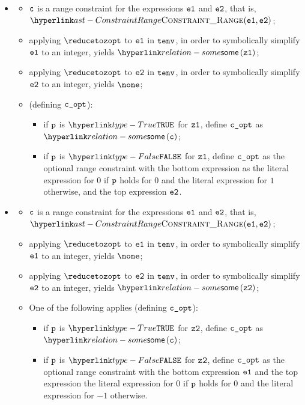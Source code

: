 \begin{itemize}
  \item {}
  \begin{itemize}
    \item $\texttt{c}$ is a range constraint for the expressions $\texttt{e1}$ and $\texttt{e2}$, that is, \\
          $\ConstraintRange(\veone, \vetwo)$;
    \item applying $\reducetozopt$ to $\texttt{e1}$ in $\texttt{tenv}$, in order to symbolically simplify $\texttt{e1}$ to an integer,
          yields $\some{\vzone}$;
    \item applying $\reducetozopt$ to $\texttt{e2}$ in $\texttt{tenv}$, in order to symbolically simplify $\texttt{e2}$ to an integer,
          yields $\none$;
    \item \OneApplies{} (defining $\texttt{c\_opt}$):
    \begin{itemize}
      \item if $\texttt{p}$ is $\True$ for $\texttt{z1}$, define $\texttt{c\_opt}$ as $\some{\vc}$;
      \item if $\texttt{p}$ is $\False$ for $\texttt{z1}$, define $\texttt{c\_opt}$ as the optional range constraint with the bottom expression
            as the literal expression for $0$ if $\texttt{p}$ holds for $0$ and the literal expression for $1$ otherwise,
            and the top expression $\texttt{e2}$.
    \end{itemize}
  \end{itemize}

  \item {}
  \begin{itemize}
    \item $\texttt{c}$ is a range constraint for the expressions $\texttt{e1}$ and $\texttt{e2}$, that is, \\
          $\ConstraintRange(\veone, \vetwo)$;
    \item applying $\reducetozopt$ to $\texttt{e1}$ in $\texttt{tenv}$, in order to symbolically simplify $\texttt{e1}$ to an integer,
          yields $\none$;
    \item applying $\reducetozopt$ to $\texttt{e2}$ in $\texttt{tenv}$, in order to symbolically simplify $\texttt{e2}$ to an integer,
          yields $\some{\vztwo}$;
    \item One of the following applies (defining $\texttt{c\_opt}$):
    \begin{itemize}
      \item if $\texttt{p}$ is $\True$ for $\texttt{z2}$, define $\texttt{c\_opt}$ as $\some{\vc}$;
      \item if $\texttt{p}$ is $\False$ for $\texttt{z2}$, define $\texttt{c\_opt}$ as the optional range constraint with the bottom expression
            $\texttt{e1}$ and the top expression the literal expression for $0$ if $\texttt{p}$ holds for $0$ and the literal expression for $-1$ otherwise.
    \end{itemize}
  \end{itemize}


\end{itemize}
